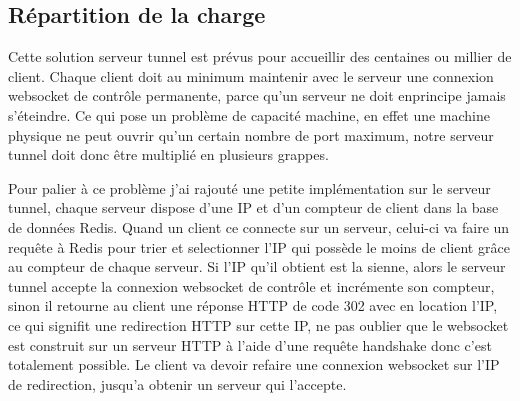 \subsection{Répartition de la charge}

Cette solution serveur tunnel est prévus pour accueillir des centaines ou millier de client. Chaque client doit au minimum maintenir avec le serveur une connexion websocket de contrôle permanente, parce qu'un serveur ne doit enprincipe jamais s'éteindre. Ce qui pose un problème de capacité machine, en effet une machine physique ne peut ouvrir qu'un certain nombre de port maximum, notre serveur tunnel doit donc être multiplié en plusieurs grappes.

Pour palier à ce problème j'ai rajouté une petite implémentation sur le serveur tunnel, chaque serveur dispose d'une IP et d'un compteur de client dans la base de données Redis. Quand un client ce connecte sur un serveur, celui-ci va faire un requête à Redis pour trier et selectionner l'IP qui possède le moins de client grâce au compteur de chaque serveur. Si l'IP qu'il obtient est la sienne, alors le serveur tunnel accepte la connexion websocket de contrôle et incrémente son compteur, sinon il retourne au client une réponse HTTP de code 302 avec en location l'IP, ce qui signifit une redirection HTTP sur cette IP, ne pas oublier que le websocket est construit sur un serveur HTTP à l'aide d'une requête handshake donc c'est totalement possible. Le client va devoir refaire une connexion websocket sur l'IP de redirection, jusqu'a obtenir un serveur qui l'accepte.

\section{}

